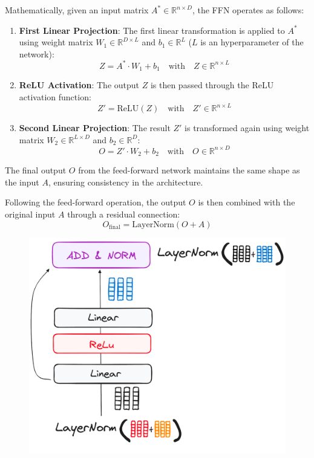 \documentclass[12pt]{article}
\begin{document}
Mathematically, given an input matrix $A^* \in \mathbb{R}^{n \times D}$, the FFN operates as follows:
\begin{enumerate}
    \item \textbf{First Linear Projection}: The first linear transformation is applied to $A^*$ using weight
    matrix $W_1 \in \mathbb{R}^{D \times L}$ and $b_1 \in \mathbb{R}^L$ ($L$ is an hyperparameter of the network):
    \begin{equation}
        Z = A^* \cdot W_1 + b_1 \quad \text{with} \quad Z \in \mathbb{R}^{n \times L}
    \end{equation}

    \item \textbf{ReLU Activation}: The output $Z$ is then passed through the ReLU activation function:
    \begin{equation}
        Z' = \text{ReLU}(Z) \quad \text{with} \quad Z' \in \mathbb{R}^{n \times L}
    \end{equation}

    \item \textbf{Second Linear Projection}: The result $Z'$ is transformed again using weight matrix 
    $W_2 \in \mathbb{R}^{L \times D}$ and $b_2 \in \mathbb{R}^D$:
    \begin{equation}
        O = Z' \cdot W_2 +b_2 \quad \text{with} \quad O \in \mathbb{R}^{n \times D}
    \end{equation}
\end{enumerate}
The final output $O$ from the feed-forward network maintains the same shape as the input $A$, ensuring 
consistency in the architecture.

Following the feed-forward operation, the output $O$ is then combined with the original input $A$ through a residual connection:
\begin{equation}
    O_{\text{final}} = \text{LayerNorm}(O + A)
\end{equation}


\begin{figure}
    \centering
    \includegraphics[width=.4\textwidth]{Images/transformer_encoder_ffn.png}
    \caption{}
    \label{fig:transformer_encoder_ffn}
\end{figure}
\end{document}
